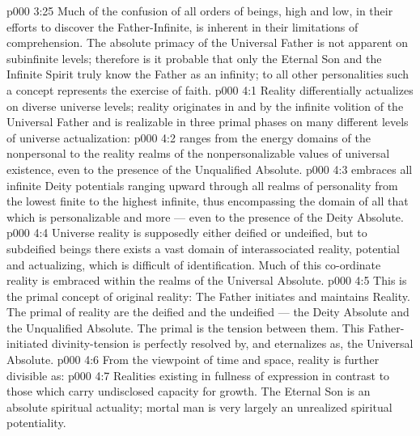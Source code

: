 \vs p000 3:25 Much of the confusion of all orders of beings, high and low, in their efforts to discover the Father\hyp{}Infinite, is inherent in their limitations of comprehension. The absolute primacy of the Universal Father is not apparent on subinfinite levels; therefore is it probable that only the Eternal Son and the Infinite Spirit truly know the Father as an infinity; to all other personalities such a concept represents the exercise of faith.
\vs p000 4:1 Reality differentially actualizes on diverse universe levels; reality originates in and by the infinite volition of the Universal Father and is realizable in three primal phases on many different levels of universe actualization:
\vs p000 4:2 \bibnobreakspace {} ranges from the energy domains of the nonpersonal to the reality realms of the nonpersonalizable values of universal existence, even to the presence of the Unqualified Absolute.
\vs p000 4:3 \bibnobreakspace {} embraces all infinite Deity potentials ranging upward through all realms of personality from the lowest finite to the highest infinite, thus encompassing the domain of all that which is personalizable and more --- even to the presence of the Deity Absolute.
\vs p000 4:4 \bibnobreakspace {} Universe reality is supposedly either deified or undeified, but to subdeified beings there exists a vast domain of interassociated reality, potential and actualizing, which is difficult of identification. Much of this co\hyp{}ordinate reality is embraced within the realms of the Universal Absolute.
\vs p000 4:5 This is the primal concept of original reality: The Father initiates and maintains Reality. The primal  of reality are the deified and the undeified --- the Deity Absolute and the Unqualified Absolute. The primal  is the tension between them. This Father\hyp{}initiated divinity\hyp{}tension is perfectly resolved by, and eternalizes as, the Universal Absolute.
\vs p000 4:6 \pc From the viewpoint of time and space, reality is further divisible as:
\vs p000 4:7 \bibnobreakspace {} Realities existing in fullness of expression in contrast to those which carry undisclosed capacity for growth. The Eternal Son is an absolute spiritual actuality; mortal man is very largely an unrealized spiritual potentiality.
